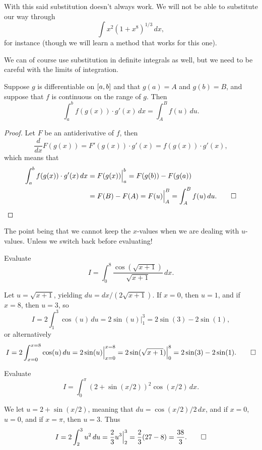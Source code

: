 \noindent
With this said substitution doesn't always work.
We will not be able to substitute our way through
\[
	\int x^2 (1 + x^8)^{1/3} \, d x,
\]
for instance (though we will learn a method that works for this one).

We can of course use substitution in definite integrals as well, but we need to be careful with the limits of integration.

\begin{theorem}
	Suppose $g$ is differentiable on $\interval{a}{b}$ and that $g(a) = A$ and $g(b) = B$, and suppose that $f$ is continuous on the range of $g$.
	Then
	\[
		\int_a^b f(g(x)) \cdot g'(x) \, d x = \int_A^B f(u) \, d u.
	\]
\end{theorem}

\begin{proof}
	Let $F$ be an antiderivative of $f$, then
	\[
		\frac{d}{d x} F(g(x)) = F'(g(x)) \cdot g'(x) = f(g(x)) \cdot g'(x),
	\]
	which means that
	\begin{align*}
		\int_a^b f(g(x)) \cdot g'(x) \, d x & = F(g(x)) \Big \rvert_a^b = F(g(b)) - F(g(a))                         \\
		                                    & = F(B) - F(A) = F(u) \Big \rvert_A^B = \int_A^B f(u) \, d u. \qedhere
	\end{align*}
\end{proof}

\noindent
The point being that we cannot keep the $x$-values when we are dealing with $u$-values.
Unless we switch back before evaluating!

\begin{example}
	Evaluate
	\[
		I = \int_0^8 \frac{\cos(\sqrt{x + 1})}{\sqrt{x + 1}} \, d x.
	\]

	\noindent
	Let $u = \sqrt{x + 1}$, yielding $d u = d x / (2 \sqrt{x + 1})$.
	If $x = 0$, then $u = 1$, and if $x = 8$, then $u = 3$, so
	\[
		I = 2 \int_1^3 \cos(u) \, d u = 2 \sin(u) \Big \rvert_1^3 = 2 \sin(3) - 2 \sin(1),
	\]
	or alternatively
	\[
		I = 2 \int_{x = 0}^{x = 8} \cos(u) \, d u = 2 \sin(u) \Big \rvert_{x = 0}^{x = 8} = 2 \sin(\sqrt{x + 1}) \Big \rvert_0^8 = 2 \sin(3) - 2 \sin(1). \qedhere
	\]
\end{example}

\begin{example}
	Evaluate
	\[
		I = \int_0^\pi (2 + \sin(x / 2))^2 \cos(x / 2) \, d x.
	\]

	\noindent
	We let $u = 2 + \sin(x / 2)$, meaning that $d u = \cos(x / 2) / 2 \, d x$, and if $x = 0$, $u = 0$, and if $x = \pi$, then $u = 3$.
	Thus
	\[
		I = 2 \int_2^3 u^2 \, d u = \frac{2}{3} u^3 \Big \rvert_2^3 = \frac{2}{3} (27 - 8) = \frac{38}{3}. \qedhere
	\]
\end{example}

